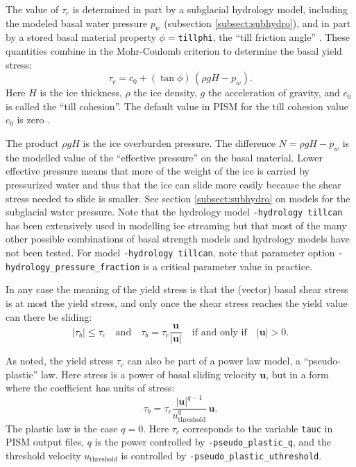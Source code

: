 The value of $\tau_c$ is determined in part by a subglacial hydrology model, including the modeled basal water pressure $p_w$ (subsection \ref{subsect:subhydro}), and in part by a stored basal material property $\phi=$\texttt{tillphi}, the ``till friction angle'' \cite{Paterson}.  These quantities combine in the Mohr-Coulomb criterion \cite[Chapter 8]{Paterson} to determine the basal yield stress:
\begin{equation}
   \tau_c = c_{0} + (\tan\phi)\,(\rho g H - p_w).  \label{eq:mohrcoulomb}
\end{equation}
Here $H$ is the ice thickness, $\rho$ the ice density, $g$ the acceleration of gravity, and $c_0$ is called the ``till cohesion''.  The default value in PISM for the till cohesion value $c_0$ is zero \cite[formula (2.4)]{SchoofStream}.

The product $\rho g H$ is the ice overburden pressure.  The difference $N=\rho g H - p_w$ is the modelled value of the ``effective pressure'' on the basal material.  Lower effective pressure means that more of the weight of the ice is carried by pressurized water and thus that the ice can slide more easily because the shear stress needed to slide is smaller.  See section \ref{subsect:subhydro} on models for the subglacial water pressure.  Note that the hydrology model \verb|-hydrology tillcan| has been extensively used in modelling ice streaming \cite{BBssasliding,BKAJS,Winkelmannetal2011} but that most of the many other possible combinations of basal strength models and hydrology models have not been tested.  For model \verb|-hydrology tillcan|, note that parameter option \verb|-hydrology_pressure_fraction| is  a critical parameter value in practice.

In any case the meaning of the yield stress is that the (vector) basal shear stress is at most the yield stress, and only once the shear stress reaches the yield value can there be sliding:
\begin{equation*}
   |\tau_b| \le \tau_c \quad \text{and} \quad \tau_b = \tau_c \frac{\mathbf{u}}{|\mathbf{u}|} \quad\text{if and only if}\quad |\mathbf{u}| > 0.
\end{equation*}

As noted, the yield stress $\tau_c$ can also be part of a power law model, a ``pseudo-plastic'' law.  Here stress is a power of basal sliding velocity $\mathbf{u}$, but in a form where the coefficient has units of stress:
\begin{equation}
\tau_b = \tau_c \frac{|\mathbf{u}|^{q-1}}{u_{\text{threshold}}^q}\, \mathbf{u}.
\label{eq:pseudopower}
\end{equation}
The plastic law is the case $q=0$.  Here $\tau_c$ corresponds to the variable \texttt{tauc} in PISM output files, $q$ is the power controlled by \texttt{-pseudo_plastic_q}, and the threshold velocity $u_{\text{threshold}}$ is controlled by \texttt{-pseudo_plastic_uthreshold}.

